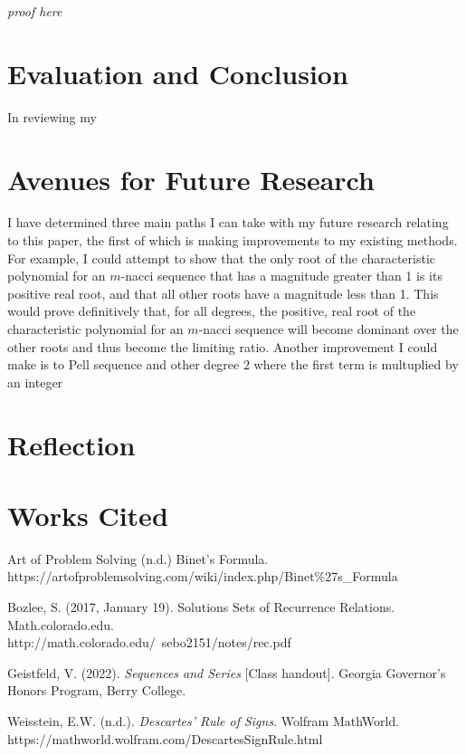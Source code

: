 \documentclass[11pt]{article}
\begin{document}
\emph{proof here}


\section{Evaluation and Conclusion}
In reviewing my 

\section{Avenues for Future Research}
    I have determined three main paths I can take with my future research relating to this paper, the first of which is making improvements to my existing methods. For example, I could attempt to show that the only root of the characteristic polynomial for an \(m\)-nacci sequence that has a magnitude greater than 1 is its positive real root, and that all other roots have a magnitude less than 1. This would prove definitively that, for all degrees, the positive, real root of the characteristic polynomial for an \(m\)-nacci sequence will become dominant over the other roots and thus become the limiting ratio. Another improvement I could make is to 
Pell sequence and other degree 2 where the first term is multuplied by an integer 

\section{Reflection}


\newpage 

\section{Works Cited}

\begin{hangparas}{.25in}{1}
    Art of Problem Solving (n.d.) Binet's Formula. \\ https://artofproblemsolving.com/wiki/index.php/Binet\%27s\_Formula

    Bozlee, S. (2017, January 19). Solutions Sets of Recurrence Relations. Math.colorado.edu. \\ http://math.colorado.edu/~sebo2151/notes/rec.pdf

    Geistfeld, V. (2022). \emph{Sequences and Series} [Class handout]. Georgia Governor's Honors Program, Berry College.
    
    Weisstein, E.W. (n.d.). \emph{Descartes' Rule of Signs}. Wolfram MathWorld. \\ https://mathworld.wolfram.com/DescartesSignRule.html
\end{hangparas}
\end{document}
